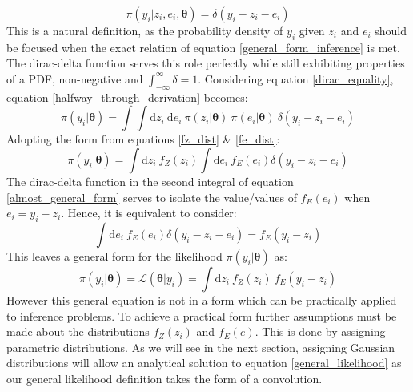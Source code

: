 \begin{equation}
\pi(y_i|z_i,e_i,\bm{\theta}) = \delta(y_i-z_i-e_i)
\label{dirac_equality}
\end{equation}
This is a natural definition, as the probability density of $y_i$ given $z_i$ and $e_i$ should be focused when the exact relation of equation \ref{general_form_inference} is met. The dirac-delta function serves this role perfectly while still exhibiting properties of a PDF, non-negative and $\int_{-\infty}^{\infty}\delta = 1$. Considering equation \ref{dirac_equality}, equation \ref{halfway_through_derivation} becomes:
\begin{equation}
\pi(y_i|\bm{\theta}) = \int \int \text{d}z_i\ \text{d}e_i\ \pi(z_i|\bm{\theta})\ \pi(e_i|\bm{\theta})\ \delta(y_i-z_i-e_i)
\end{equation}
Adopting the form from equations \ref{fz_dist} \& \ref{fe_dist}:
\begin{equation}
\pi(y_i|\bm{\theta}) = \int \text{d}z_i\ f_Z(z_i) \int \text{d}e_i\ f_E(e_i) \delta(y_i-z_i-e_i)
\label{almost_general_form}
\end{equation}
The dirac-delta function in the second integral of equation \ref{almost_general_form} serves to isolate the value/values of $f_E(e_i)$ when $e_i = y_i - z_i$. Hence, it is equivalent to consider:
\begin{equation}
\int \text{d}e_i\ f_E(e_i) \delta(y_i-z_i-e_i) = f_E(y_i - z_i)
\end{equation}
This leaves a general form for the likelihood $\pi(y_i|\bm{\theta})$ as: 
\begin{equation}
\pi(y_i|\bm{\theta}) = \mathcal{L}(\bm{\theta}|y_i) = \int \text{d}z_i\ f_Z(z_i)\ f_E(y_i - z_i)
\label{general_likelihood}
\end{equation}
However this general equation is not in a form which can be practically applied to inference problems. To achieve a practical form further assumptions must be made about the distributions $f_Z(z_i)$ and $f_E(e)$. This is done by assigning parametric distributions. As we will see in the next section, assigning Gaussian distributions will allow an analytical solution to equation \ref{general_likelihood} as our general likelihood definition takes the form of a convolution. 

